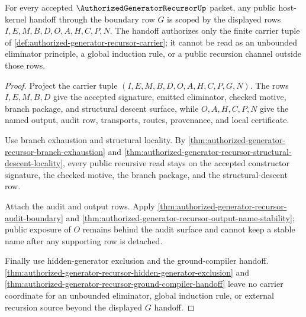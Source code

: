 \begin{theorem}
\label{thm:authorized-generator-recursor-kernel-acceptance-scope}
For every accepted $\AuthorizedGeneratorRecursorUp$ packet, any public
host-kernel handoff through the boundary row $G$ is scoped by the displayed
rows $I,E,M,B,D,O,A,H,C,P,N$. The handoff authorizes only the finite carrier
tuple of \autoref{def:authorized-generator-recursor-carrier}; it cannot be read
as an unbounded eliminator principle, a global induction rule, or a public
recursion channel outside those rows.
\end{theorem}
\begin{proof}
Project the carrier tuple
$(I,E,M,B,D,O,A,H,C,P,G,N)$. The rows $I,E,M,B,D$ give the accepted signature,
emitted eliminator, checked motive, branch package, and structural descent
surface, while $O,A,H,C,P,N$ give the named output, audit row, transports,
routes, provenance, and local certificate.

Use branch exhaustion and structural locality. By
\autoref{thm:authorized-generator-recursor-branch-exhaustion} and
\autoref{thm:authorized-generator-recursor-structural-descent-locality}, every
public recursive read stays on the accepted constructor signature, the checked
motive, the branch package, and the structural-descent row.

Attach the audit and output rows. Apply
\autoref{thm:authorized-generator-recursor-audit-boundary} and
\autoref{thm:authorized-generator-recursor-output-name-stability}; public
exposure of $O$ remains behind the audit surface and cannot keep a stable name
after any supporting row is detached.

Finally use hidden-generator exclusion and the ground-compiler handoff.
\autoref{thm:authorized-generator-recursor-hidden-generator-exclusion} and
\autoref{thm:authorized-generator-recursor-ground-compiler-handoff} leave no
carrier coordinate for an unbounded eliminator, global induction rule, or
external recursion source beyond the displayed $G$ handoff.
\end{proof}


